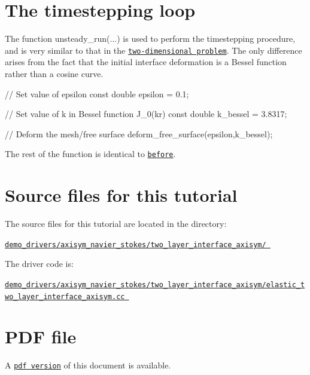  

\hypertarget{index_unsteady_run}{}\section{The timestepping loop}\label{index_unsteady_run}
The function {\ttfamily unsteady\+\_\+run}(...) is used to perform the timestepping procedure, and is very similar to that in the \href{../../../navier_stokes/two_layer_interface/html/index.html#unsteady_run}{\tt two-\/dimensional problem}. The only difference arises from the fact that the initial interface deformation is a Bessel function rather than a cosine curve.


\begin{DoxyCodeInclude}
 \textcolor{comment}{// Set value of epsilon}
 \textcolor{keyword}{const} \textcolor{keywordtype}{double} epsilon = 0.1;
 
 \textcolor{comment}{// Set value of k in Bessel function J\_0(kr)}
 \textcolor{keyword}{const} \textcolor{keywordtype}{double} k\_bessel = 3.8317;

 \textcolor{comment}{// Deform the mesh/free surface}
 deform\_free\_surface(epsilon,k\_bessel);

\end{DoxyCodeInclude}


The rest of the function is identical to \href{../../../navier_stokes/two_layer_interface/html/index.html#unsteady_run}{\tt before}.



 

\hypertarget{index_sources}{}\section{Source files for this tutorial}\label{index_sources}

\begin{DoxyItemize}
\item The source files for this tutorial are located in the directory\+: \begin{center} \href{../../../../demo_drivers/axisym_navier_stokes/two_layer_interface_axisym/}{\tt demo\+\_\+drivers/axisym\+\_\+navier\+\_\+stokes/two\+\_\+layer\+\_\+interface\+\_\+axisym/ } \end{center} 
\item The driver code is\+: \begin{center} \href{../../../../demo_drivers/axisym_navier_stokes/two_layer_interface_axisym/elastic_two_layer_interface_axisym.cc}{\tt demo\+\_\+drivers/axisym\+\_\+navier\+\_\+stokes/two\+\_\+layer\+\_\+interface\+\_\+axisym/elastic\+\_\+two\+\_\+layer\+\_\+interface\+\_\+axisym.\+cc } \end{center} 
\end{DoxyItemize}



 

 \hypertarget{index_pdf}{}\section{P\+D\+F file}\label{index_pdf}
A \href{../latex/refman.pdf}{\tt pdf version} of this document is available. 
